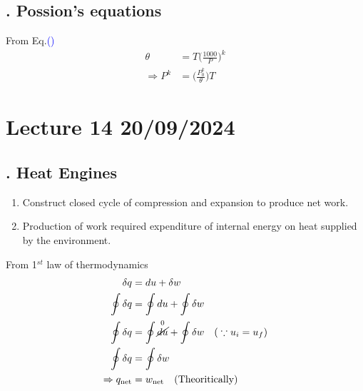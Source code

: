 \documentclass[fleqn,10pt]{SelfArx} %
\newcommand{\myeqref}[1]{\textcolor{blue}{\textup{(\getrefnumber{#1})}}}
\begin{document}
\subsection{. Possion's equations}
From Eq.\myeqref{eq:poissonsEq}
\begin{align}
    \theta &= T\Big(\frac{1000}{P}\Big)^k \\
    \Rightarrow P^k &= \Big(\frac{P_0^k}{\theta}\Big)T
\end{align}


\clearpage

\section{Lecture 14 20/09/2024}

\subsection{. Heat Engines}
\begin{enumerate}
    \item Construct closed cycle of compression and expansion to produce net work.
    \item Production of work required expenditure of internal energy on heat supplied by the environment.
\end{enumerate}

From 1$^{st}$ law of thermodynamics
\begin{align}
    \delta q &= du + \delta w \\
    \oint \delta q &= \oint du + \oint \delta w \\
    \oint \delta q &= \oint \overset{0}{\cancel{du}} + \oint \delta w \quad \text{(} \because u_i = u_f\text{)} \\
    \oint \delta q &= \oint \delta w \\
    \Rightarrow q_{\text{net}} &= w_{\text{net}} \quad \text{(Theoritically)}
\end{align}
\end{document}
